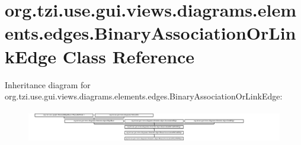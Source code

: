 \hypertarget{classorg_1_1tzi_1_1use_1_1gui_1_1views_1_1diagrams_1_1elements_1_1edges_1_1_binary_association_or_link_edge}{\section{org.\-tzi.\-use.\-gui.\-views.\-diagrams.\-elements.\-edges.\-Binary\-Association\-Or\-Link\-Edge Class Reference}
\label{classorg_1_1tzi_1_1use_1_1gui_1_1views_1_1diagrams_1_1elements_1_1edges_1_1_binary_association_or_link_edge}
}
Inheritance diagram for org.\-tzi.\-use.\-gui.\-views.\-diagrams.\-elements.\-edges.\-Binary\-Association\-Or\-Link\-Edge\-:\begin{figure}[H]
\begin{center}
\leavevmode
\includegraphics[height=1.486200cm]{classorg_1_1tzi_1_1use_1_1gui_1_1views_1_1diagrams_1_1elements_1_1edges_1_1_binary_association_or_link_edge}
\end{center}
\end{figure}
